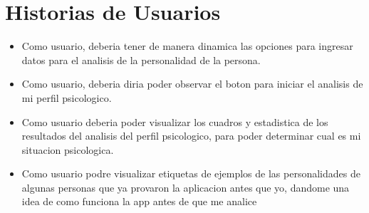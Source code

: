 \chapter{Historias de Usuarios}

	\begin{itemize}
	\item Como usuario, deberia tener de manera dinamica las opciones para ingresar datos
	para el analisis de la personalidad de la persona.
	
	\item Como usuario, deberia diria poder observar el boton para iniciar el analisis de mi perfil psicologico.
	
	\item Como usuario deberia poder visualizar los cuadros y estadistica de los resultados del analisis
	del perfil psicologico, para poder determinar cual es mi situacion psicologica.
	
	\item Como usuario podre visualizar etiquetas de ejemplos de las personalidades de algunas personas
	que ya provaron la aplicacion antes que yo, dandome una idea de como funciona la app
	antes de que me analice
	
	\end{itemize}